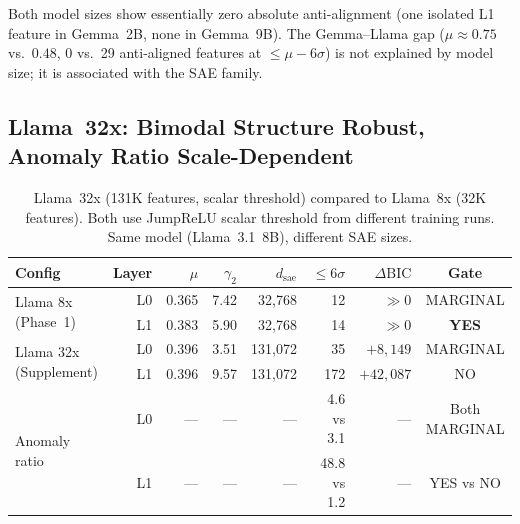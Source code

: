 \documentclass[11pt,a4paper]{article}
\begin{document}
Both model sizes show essentially zero absolute anti-alignment (one isolated L1 feature in Gemma~2B, none in Gemma~9B). The Gemma--Llama gap ($\mu \approx 0.75$ vs.\ $0.48$, 0 vs.\ 29 anti-aligned features at $\leq\mu-6\sigma$) is not explained by model size; it is associated with the SAE family.

\subsection{Llama~32x: Bimodal Structure Robust, Anomaly Ratio Scale-Dependent}
\label{sec:llama32x}

\begin{table}[H]
\centering
\caption{Llama~32x (131K features, scalar threshold) compared to Llama~8x (32K features). Both use JumpReLU scalar threshold from different training runs. Same model (Llama~3.1~8B), different SAE sizes.}
\label{tab:llama32x}
\small
\setlength{\tabcolsep}{4pt}
\begin{tabular}{@{}lrrrrrrc@{}}
\toprule
Config & Layer & $\mu$ & $\gamma_2$ & $d_\text{sae}$ & ${\leq}6\sigma$ & $\Delta\text{BIC}$ & Gate \\
\midrule
\multirow{2}{*}{Llama 8x (Phase~1)} & L0 & 0.365 & 7.42 & 32{,}768 & 12 & $\gg0$ & MARGINAL \\
 & L1 & 0.383 & 5.90 & 32{,}768 & 14 & $\gg0$ & \textbf{YES} \\
\midrule
\multirow{2}{*}{Llama 32x (Supplement)} & L0 & 0.396 & 3.51 & 131{,}072 & 35 & $+8{,}149$ & MARGINAL \\
 & L1 & 0.396 & 9.57 & 131{,}072 & 172 & $+42{,}087$ & NO \\
\midrule
\multirow{2}{*}{Anomaly ratio} & L0 & --- & --- & --- & 4.6 vs 3.1 & --- & Both MARGINAL \\
 & L1 & --- & --- & --- & 48.8 vs 1.2 & --- & YES vs NO \\
\bottomrule
\end{tabular}
\end{table}
\end{document}
